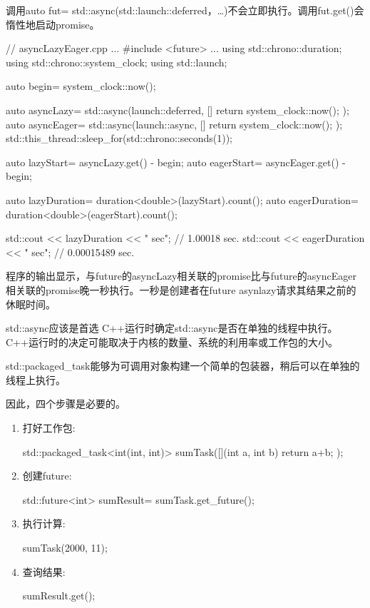 调用auto fut= std::async(std::launch::deferred，…)不会立即执行。调用fut.get()会惰性地启动promise。


\begin{cpp}
// asyncLazyEager.cpp
...
#include <future>
...
using std::chrono::duration;
using std::chrono::system_clock;
using std::launch;

auto begin= system_clock::now();

auto asyncLazy= std::async(launch::deferred, []{ return system_clock::now(); });
auto asyncEager= std::async(launch::async, []{ return system_clock::now(); });
std::this_thread::sleep_for(std::chrono::seconds(1));

auto lazyStart= asyncLazy.get() - begin;
auto eagerStart= asyncEager.get() - begin;

auto lazyDuration= duration<double>(lazyStart).count();
auto eagerDuration= duration<double>(eagerStart).count();

std::cout << lazyDuration << " sec"; // 1.00018 sec.
std::cout << eagerDuration << " sec"; // 0.00015489 sec.
\end{cpp}

程序的输出显示，与future的asyncLazy相关联的promise比与future的asyncEager相关联的promise晚一秒执行。一秒是创建者在future asynlazy请求其结果之前的休眠时间。

\begin{myTip}{std::async应该是首选}
C++运行时确定std::async是否在单独的线程中执行。C++运行时的决定可能取决于内核的数量、系统的利用率或工作包的大小。
\end{myTip}


std::packaged\_task能够为可调用对象构建一个简单的包装器，稍后可以在单独的线程上执行。

因此，四个步骤是必要的。

\begin{enumerate}[label=\Roman*.]
\item 
打好工作包:

\begin{cpp}
std::packaged_task<int(int, int)> sumTask([](int a, int b){ return a+b; });
\end{cpp}

\item
创建future:

\begin{cpp}
std::future<int> sumResult= sumTask.get_future();
\end{cpp}
 
\item 
执行计算:

\begin{cpp}
sumTask(2000, 11);
\end{cpp}

\item 
查询结果:

\begin{cpp}
sumResult.get();
\end{cpp}

\end{enumerate}

